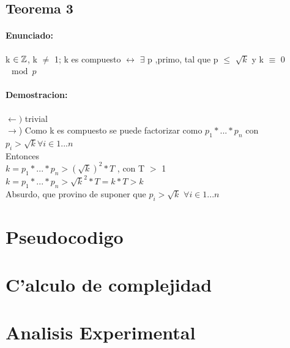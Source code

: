 \subsection{Teorema 3}
\paragraph{Enunciado:}
k ${\in {\mathbb Z}}$, k $\neq$ 1; k es compuesto $\longleftrightarrow$ $\exists$ p ,primo, tal que p $\leq$ $\sqrt{k}$ y k $\equiv$ 0 $\mod{p}$ \\
\paragraph{Demostracion:}
$\leftarrow)$ trivial \\
$\rightarrow$) Como k es compuesto se puede factorizar como $p_1*...*p_n$ con $p_i > \sqrt{k} \forall i \in {1...n}$\\
Entonces \\
$k = p_1*...*p_n > (\sqrt{k})^2* T $ , con T $>$ 1\\  
$k = p_1*...*p_n > \sqrt{k}^2* T = k*T > k$ \\
Absurdo, que provino de suponer que $p_i > \sqrt{k}$ $\forall i \in {1...n}$\\

\section{Pseudocodigo}


\section{C'alculo de complejidad}

\section{Analisis Experimental}
